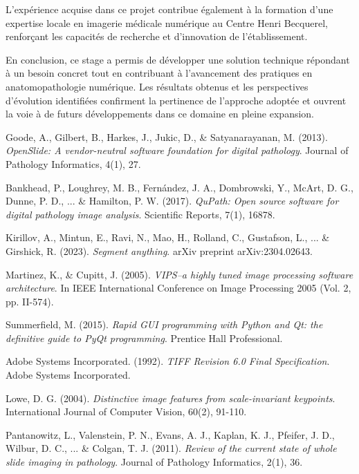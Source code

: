 \documentclass[12pt,a4paper]{report}
\begin{document}
L'expérience acquise dans ce projet contribue également à la formation d'une expertise locale en imagerie médicale numérique au Centre Henri Becquerel, renforçant les capacités de recherche et d'innovation de l'établissement.

En conclusion, ce stage a permis de développer une solution technique répondant à un besoin concret tout en contribuant à l'avancement des pratiques en anatomopathologie numérique. Les résultats obtenus et les perspectives d'évolution identifiées confirment la pertinence de l'approche adoptée et ouvrent la voie à de futurs développements dans ce domaine en pleine expansion.

\begin{thebibliography}{20}

Goode, A., Gilbert, B., Harkes, J., Jukic, D., \& Satyanarayanan, M. (2013). 
\textit{OpenSlide: A vendor-neutral software foundation for digital pathology}. 
Journal of Pathology Informatics, 4(1), 27.

Bankhead, P., Loughrey, M. B., Fernández, J. A., Dombrowski, Y., McArt, D. G., Dunne, P. D., ... \& Hamilton, P. W. (2017). 
\textit{QuPath: Open source software for digital pathology image analysis}. 
Scientific Reports, 7(1), 16878.

Kirillov, A., Mintun, E., Ravi, N., Mao, H., Rolland, C., Gustafson, L., ... \& Girshick, R. (2023). 
\textit{Segment anything}. 
arXiv preprint arXiv:2304.02643.

Martinez, K., \& Cupitt, J. (2005). 
\textit{VIPS–a highly tuned image processing software architecture}. 
In IEEE International Conference on Image Processing 2005 (Vol. 2, pp. II-574).

Summerfield, M. (2015). 
\textit{Rapid GUI programming with Python and Qt: the definitive guide to PyQt programming}. 
Prentice Hall Professional.

Adobe Systems Incorporated. (1992). 
\textit{TIFF Revision 6.0 Final Specification}. 
Adobe Systems Incorporated.

Lowe, D. G. (2004). 
\textit{Distinctive image features from scale-invariant keypoints}. 
International Journal of Computer Vision, 60(2), 91-110.

Pantanowitz, L., Valenstein, P. N., Evans, A. J., Kaplan, K. J., Pfeifer, J. D., Wilbur, D. C., ... \& Colgan, T. J. (2011). 
\textit{Review of the current state of whole slide imaging in pathology}. 
Journal of Pathology Informatics, 2(1), 36.


\end{thebibliography}
\end{document}
